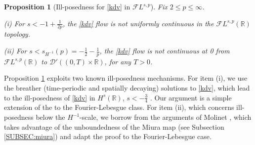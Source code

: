 \documentclass[a4paper,
11pt,  reqno]{amsart}
\newcommand{\5}{\textup{V}}
\newcommand{\noi}{\noindent}
\newcommand{\FL}{\mathcal{F} L}
\newtheorem{proposition}[theorem]{Proposition}
\theoremstyle{remark}
\newcommand{\R}{\mathbb{R}}
\newcommand{\Gc}{\mathcal{G}}
\numberwithin{equation}{section}
\numberwithin{theorem}{section}
\begin{document}
	\begin{proposition}[Ill-posedness for \eqref{kdv} in $\FL^{s,p}$]\label{prop:ill_intro}
		Fix $2\le p \le \infty$.
        
    \noi (i) For $s<-1+\frac1{2p}$, the \eqref{kdv} flow is not uniformly continuous in the $\FL^{s,p}(\R)$ topology.
        
    \noi (ii) For $s<s_{H^{-1}}(p)=-\frac12 - \frac1p$, the \eqref{kdv} flow is not continuous at 0 from $\mathcal{F}L^{s,p}(\R)$ to {$\mathcal{D}'((0,T)\times \R)$}, for any $T>0$.
	\end{proposition}

Proposition \ref{prop:ill_intro} exploits two known ill-posedness mechanisms. For item (i), we use the breather  (time-periodic and spatially decaying) solutions to \eqref{kdv}, which lead to the ill-posedness of \eqref{kdv} in $H^s(\R)$, $s<-\frac34$ \cite{KPV_ill}. Our argument is a simple extension of the \cite{KPV_ill} to the Fourier-Lebesgue class. For item (ii), which concerns ill-posedness below the $H^{-1}$-scale, we borrow from the arguments of Molinet \cite{Molinet_ill_line}, which takes advantage of the unboundedness of the Miura map (see Subsection \ref{SUBSEC:miura}) and adapt the proof to the Fourier-Lebesgue case.






\end{document}
